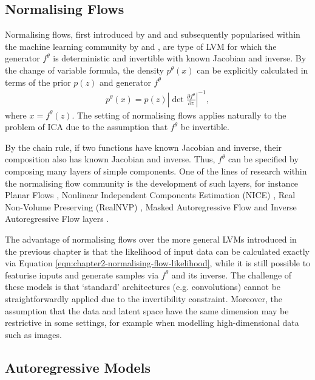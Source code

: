 \subsection{Normalising Flows}\label{subsec:normalising-flows}

Normalising flows, first introduced by \cite{tabak2010density} and \cite{tabak2013family} and subsequently popularised within the machine learning community by \cite{dinh2014nice} and \cite{rezende2015variational}, are type of LVM for which the generator $f^\theta$ is deterministic and invertible with known Jacobian and inverse.
By the change of variable formula, the density $p^\theta(x)$ can be explicitly calculated in terms of the prior $p(z)$ and generator $f^\theta$
%
\begin{align}\label{eqn:chapter2-normalising-flow-likelihood}
p^\theta(x) = p(z) \left| \det \frac{\partial f^\theta}{\partial z}\right|^{-1},
\end{align}
%
where $x=f^\theta(z)$. 
The setting of normalising flows applies naturally to the problem of ICA due to the assumption that $f^\theta$ be invertible. 


By the chain rule, if two functions have known Jacobian and inverse, their composition also has known Jacobian and inverse. 
Thus, $f^\theta$ can be specified by composing many layers of simple components. 
One of the lines of research within the normalising flow community is the development of such layers, for instance Planar Flows \citep{rezende2015variational}, Nonlinear Independent Components Estimation (NICE) \citep{dinh2014nice}, Real Non-Volume Preserving (RealNVP) \citep{dinh2016density}, Masked Autoregressive Flow \citep{papamakarios2017masked} and Inverse Autoregressive Flow layers \citep{kingma2016improved}. 

The advantage of normalising flows over the more general LVMs introduced in the previous chapter is that the likelihood of input data can be calculated exactly via Equation \ref{eqn:chapter2-normalising-flow-likelihood}, while it is still possible to featurise inputs and generate samples via $f^\theta$ and its inverse. 
The challenge of these models is that `standard' architectures (e.g. convolutions) cannot be straightforwardly applied due to the invertibility constraint. 
Moreover, the assumption that the data and latent space have the same dimension may be restrictive in some settings, for example when modelling high-dimensional data such as images. 



\subsection{Autoregressive Models}

